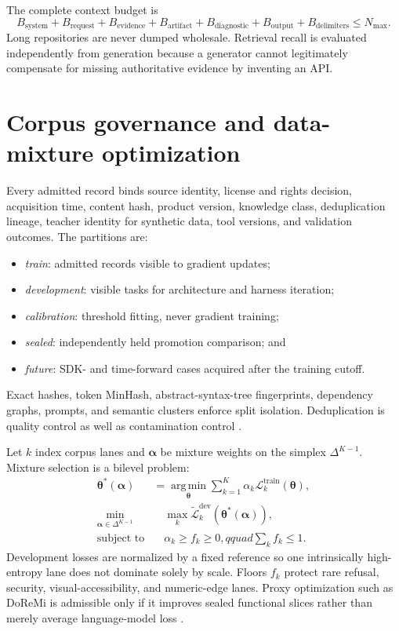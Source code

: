 \documentclass[10pt,letterpaper]{article}
\newcommand{\1}{\mathbb{1}}
\newcommand{\vect}[1]{\bm{#1}}
\newcommand{\argmin}{\operatorname*{arg\,min}}
\begin{document}
The complete context budget is
\begin{equation}
  B_{\mathrm{system}}+B_{\mathrm{request}}+B_{\mathrm{evidence}}
  +B_{\mathrm{artifact}}+B_{\mathrm{diagnostic}}+B_{\mathrm{output}}
  +B_{\mathrm{delimiters}}
  \le N_{\max}.
  \label{eq:context-budget}
\end{equation}
Long repositories are never dumped wholesale.  Retrieval recall is evaluated independently from
generation because a generator cannot legitimately compensate for missing authoritative evidence by
inventing an API.

\section{Corpus governance and data-mixture optimization}

Every admitted record binds source identity, license and rights decision, acquisition time, content
hash, product version, knowledge class, deduplication lineage, teacher identity for synthetic data,
tool versions, and validation outcomes.  The partitions are:
\begin{itemize}
  \item \emph{train}: admitted records visible to gradient updates;
  \item \emph{development}: visible tasks for architecture and harness iteration;
  \item \emph{calibration}: threshold fitting, never gradient training;
  \item \emph{sealed}: independently held promotion comparison; and
  \item \emph{future}: SDK- and time-forward cases acquired after the training cutoff.
\end{itemize}
Exact hashes, token MinHash, abstract-syntax-tree fingerprints, dependency graphs, prompts, and
semantic clusters enforce split isolation.  Deduplication is quality control as well as contamination
control \cite{lee2022dedup,lozhkov2024starcoder2}.

Let $k$ index corpus lanes and $\vect\alpha$ be mixture weights on the simplex
$\Delta^{K-1}$.  Mixture selection is a bilevel problem:
\begin{align}
  \vect\theta^*(\vect\alpha)
  &=\argmin_{\vect\theta}
    \sum_{k=1}^{K}\alpha_k\mathcal L_k^{\mathrm{train}}(\vect\theta),\\
  \min_{\vect\alpha\in\Delta^{K-1}}
  &\quad\max_k\widetilde{\mathcal L}_k^{\mathrm{dev}}
        (\vect\theta^*(\vect\alpha)),\\
  \text{subject to}
  &\quad\alpha_k\ge f_k\ge0,qquad \sum_k f_k\le1.
  \label{eq:data-mixture}
\end{align}
Development losses are normalized by a fixed reference so one intrinsically high-entropy lane does
not dominate solely by scale.  Floors $f_k$ protect rare refusal, security, visual-accessibility, and
numeric-edge lanes.  Proxy optimization such as DoReMi is admissible only if it improves sealed
functional slices rather than merely average language-model loss \cite{xie2023doremi}.
\end{document}
